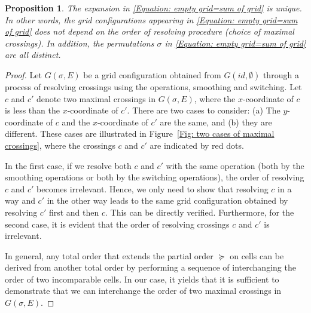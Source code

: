 \documentclass[reqno,12pt]{amsart}
\newtheorem{prop}[thm]{Proposition}
\theoremstyle{definition}
\theoremstyle{remark}
\begin{document}
\begin{prop} \label{prop:well-def}
  The expansion in \eqref{Equation: empty grid=sum of grid} is unique.
  In other words, the grid configurations appearing in
  \eqref{Equation: empty grid=sum of grid} does not depend on
  the order of resolving procedure (choice of maximal crossings).
  In addition, the permutations $\sigma$ in
  \eqref{Equation: empty grid=sum of grid} are all distinct. 
\end{prop}
\begin{proof}
  Let \( G(\sigma,E) \) be a grid configuration obtained from $G(id,\emptyset)$
  through a process of resolving crossings using the operations, smoothing and
  switching.
  Let \( c \) and \( c' \) denote two maximal crossings in $G(\sigma,E)$,
  where the $x$-coordinate of $c$ is less than the $x$-coordinate of $c'$.
  There are two cases to consider: (a) The $y$-coordinate of $c$ and the $x$-coordinate of $c'$
  are the same, and (b) they are different.
  These cases are illustrated in Figure~\ref{Fig: two cases of maximal crossings},
  where the crossings $c$ and $c'$ are indicated by red dots.

  In the first case, if we resolve both $c$ and $c'$ with the same operation
  (both by the smoothing operations or both by the switching operations),
  the order of resolving $c$ and $c'$
  becomes irrelevant. Hence, we only need to show that resolving $c$ in a way and
  $c'$ in the other way leads to the same grid configuration obtained by resolving
  $c'$ first and then $c$. This can be directly verified.
  Furthermore, for the second case, it is evident that the order of resolving
  crossings $c$ and $c'$ is irrelevant.

  In general, any total order that extends the partial order  \( \succeq \) on
  cells can be derived from another total order by performing a sequence of
  interchanging the order of two incomparable cells.
  In our case, it yields that it is sufficient to demonstrate that we can
  interchange the order of two maximal crossings in \( G(\sigma,E) \).
  

\end{proof}
\end{document}
